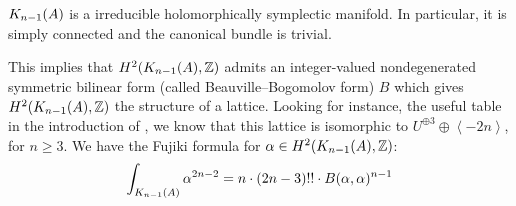 \begin{theorem}\cite[Th\'eor\`eme 4]{Beauville}
$\kum{A}{n-1}$ is a irreducible holomorphically symplectic manifold. In particular, it is simply connected and the canonical bundle is trivial.
\end{theorem}
This implies that $H^2(\kum{A}{n-1},\Z)$ admits an integer-valued nondegenerated symmetric bilinear form (called Beauville--Bogomolov form) $B$ which gives $H^2(\kum{A}{n-1},\Z)$ the structure of a lattice. Looking for instance, the useful table in the introduction of \cite{Rapagnetta}, we know that this lattice is
isomorphic to $U^{\oplus 3}\oplus \left< -2n \right>$, for $n\geq 3$. 
We have the Fujiki formula for $\alpha\in H^2(\kum{A}{n-1},\Z)$:
\begin{equation} \label{fujiki}
\int_{\kum{A}{n-1}} \alpha^{2n-2} = n\cdot(2n-3)!!\cdot B(\alpha,\alpha)^{n-1}
\end{equation}

